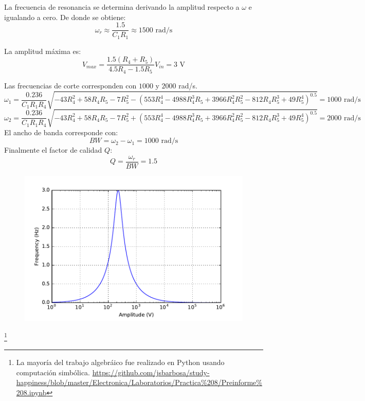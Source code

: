 \documentclass[11pt]{article}
\begin{document}
La frecuencia de resonancia se determina derivando la amplitud respecto a $\omega$ e igualando a cero. De donde se obtiene:
\begin{equation*}
	\omega_r \approx \dfrac{1.5}{C_1R_1} \approx 1500 \text{ rad/s}
\end{equation*}

La amplitud m\'axima es:
\begin{equation*}
	V_{max} = 
	\dfrac{1.5\left(R_{4} + R_{5}\right)}{4.5R_{4} - 1.5R_{5}}V_{in} = 3 \text{ V}
\end{equation*}

Las frecuencias de corte corresponden con $1000$ y $2000$ rad/s.
\begin{equation*}
	\omega_1 = \dfrac{0.236}{C_{1} R_{1} R_{4}} \sqrt{- 43 R_{4}^{2} + 58 R_{4} R_{5} - 7 R_{5}^{2} - \left(553 R_{4}^{4} - 4988 R_{4}^{3} R_{5} + 3966 R_{4}^{2} R_{5}^{2} - 812R_{4} R_{5}^{3} + 49 R_{5}^{4}\right)^{0.5}}=1000 \text{ rad/s}
\end{equation*}
\begin{equation*}
\omega_2 = \dfrac{0.236}{C_{1} R_{1} R_{4}} \sqrt{- 43 R_{4}^{2} + 58 R_{4} R_{5} - 7 R_{5}^{2} + \left(553 R_{4}^{4} - 4988 R_{4}^{3} R_{5} + 3966 R_{4}^{2} R_{5}^{2} - 812R_{4} R_{5}^{3} + 49 R_{5}^{4}\right)^{0.5}}=2000 \text{ rad/s}
\end{equation*}
El ancho de banda corresponde con:
\begin{equation}
BW = \omega_2-\omega_1 = 1000 \text{ rad/s}
\end{equation}
Finalmente el factor de calidad $Q$:
\begin{equation}
Q = \dfrac{\omega_r}{BW} = 1.5
\end{equation}
\begin{figure}[h]
	\centering
	\includegraphics[width=0.5\linewidth]{band-pass-plot.pdf}
\end{figure}
\let\thefootnote\relax\footnote{La mayor\'ia del trabajo algebr\'aico fue realizado en Python usando computaci\'on simb\'olica. \href{https://github.com/jsbarbosa/study-happiness/blob/master/Electronica/Laboratorios/Practica\%208/Preinforme\%208.ipynb}{https://github.com/jsbarbosa/study-happiness/blob/master/Electronica/Laboratorios/Practica\%208/Preinforme\%208.ipynb}}
\end{document}
